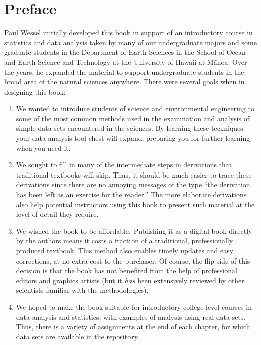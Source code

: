 \chapter*{Preface}

Paul Wessel initially developed this book in support of an introductory course in statistics
and data analysis taken by many of our undergraduate majors and some graduate students in the Department of
Earth Sciences in the School of Ocean and Earth Science and Technology at
the University of Hawaii at M\={a}noa.  Over the years, he
expanded the material to support undergraduate students in the broad area of the natural sciences
anywhere.  There were several goals when in designing this book:
\begin{enumerate}
\item We wanted to introduce students of science and environmental engineering to some
   of the most common methods used in the examination and analysis of simple data sets
   encountered in the sciences.  By learning these techniques your data analysis tool
   chest will expand, preparing you for further learning when you need it.
\item We sought to fill in many of the intermediate steps in derivations that traditional
   textbooks will skip.  Thus, it should be much easier to trace these derivations since there
   are no annoying messages of the type ``the derivation has been left as an exercise for the reader.''
   The more elaborate derivations also help potential instructors using this book to present such
   material at the level of detail they require.
\item We wished the book to be affordable.  Publishing it as a digital book directly by the authors
   means it costs a fraction of a traditional, professionally produced textbook.  This method also enables timely updates
   and easy corrections, at no extra cost to the purchaser.  Of course, the flip-side of this decision
   is that the book has not benefited from the help of professional editors and graphics artists
   (but it \emph{has} been extensively reviewed by other scientists familiar with the methodologies).
\item We hoped to make the book suitable for introductory college level courses in data analysis and statistics, with
   examples of analysis using real data sets.  Thus, there is a
   variety of assignments at the end of each chapter, for which data sets are available in the repository.
\end{enumerate}


